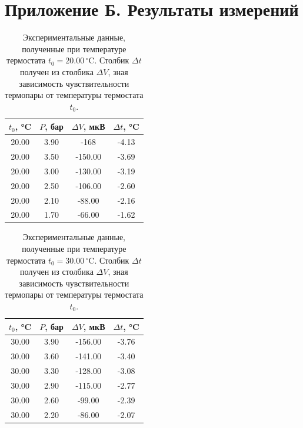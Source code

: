 \section{Приложение Б. Результаты измерений}

\begin{table}[h]
\centering
\begin{tabular}{|c|c|c|c|}
\hline
$t_0$, °C & $P$, бар & $\Delta V$, мкВ & $\Delta t$, °C \\ \hline
20.00 & 3.90 & -168 & -4.13 \\ \hline
20.00 & 3.50 & -150.00 & -3.69 \\ \hline
20.00 & 3.00 & -130.00 & -3.19 \\ \hline
20.00 & 2.50 & -106.00 & -2.60 \\ \hline
20.00 & 2.10 & -88.00 & -2.16 \\ \hline
20.00 & 1.70 & -66.00 & -1.62 \\ \hline
\end{tabular}
\caption{Экспериментальные данные, полученные при температуре термостата $t_0 = 20.00\,^\circ\text{C}$. Столбик $\Delta t$ получен из столбика $\Delta V$, зная зависимость чувствительности термопары от температуры термостата $t_0$.}
\end{table}

\begin{table}[h]
\centering
\begin{tabular}{|c|c|c|c|}
\hline
$t_0$, °C & $P$, бар & $\Delta V$, мкВ & $\Delta t$, °C \\ \hline
30.00 & 3.90 & -156.00 & -3.76 \\ \hline
30.00 & 3.60 & -141.00 & -3.40 \\ \hline
30.00 & 3.30 & -128.00 & -3.08 \\ \hline
30.00 & 2.90 & -115.00 & -2.77 \\ \hline
30.00 & 2.60 & -99.00 & -2.39 \\ \hline
30.00 & 2.20 & -86.00 & -2.07 \\ \hline
\end{tabular}
\caption{Экспериментальные данные, полученные при температуре термостата $t_0 = 30.00\,^\circ\text{C}$. Столбик $\Delta t$ получен из столбика $\Delta V$, зная зависимость чувствительности термопары от температуры термостата $t_0$.}
\end{table}

